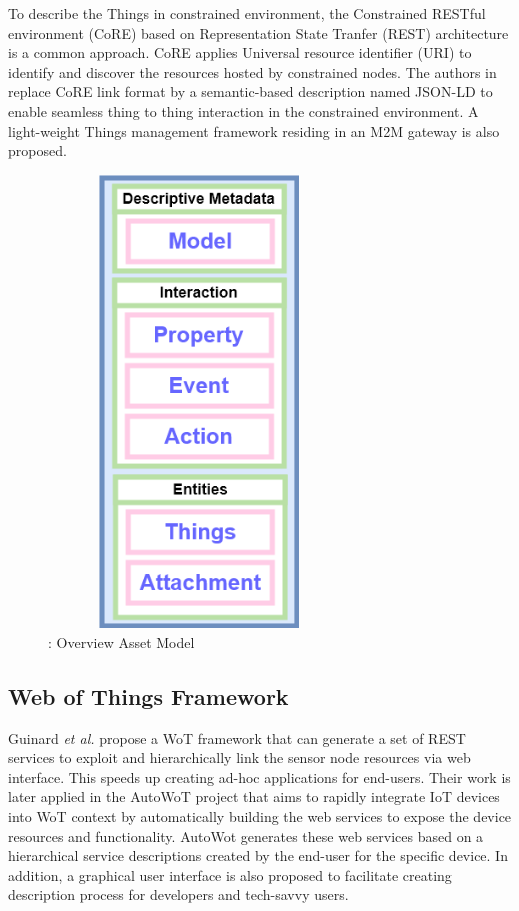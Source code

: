 To describe the Things in constrained environment, the Constrained RESTful environment (CoRE) based on Representation State Tranfer (REST) architecture is a common approach. CoRE applies Universal resource identifier (URI) to identify and discover the resources hosted by constrained nodes. The authors in \cite{7520965} replace CoRE link format by a semantic-based description named JSON-LD to enable seamless thing to thing interaction in the constrained environment.  A light-weight Things management framework residing in an M2M gateway is also proposed.
\begin{figure}[h]
	\centering
	\includegraphics[width=8cm,height=12cm,keepaspectratio]{./Part2/Chapter6/figures/asset-descriptions-1.png}
	\caption{ : Overview Asset Model}
	\label{fig: Overview Asset Model}
\end{figure}
\subsection{Web of Things Framework}
Guinard \textit{et al.} propose a WoT framework that can generate a set of REST services to exploit and hierarchically link the sensor node resources via web interface\cite{guinard2009towards}. This speeds up creating ad-hoc applications for end-users. Their work is later applied in the AutoWoT project \cite{mayer2010facilitating} that aims to rapidly integrate IoT devices into WoT context by automatically building the web services to expose the device resources and functionality. AutoWot generates these web services based on a hierarchical service descriptions created by the end-user for the specific device. In addition, a graphical user interface is also proposed to facilitate creating description process for developers and tech-savvy users.

